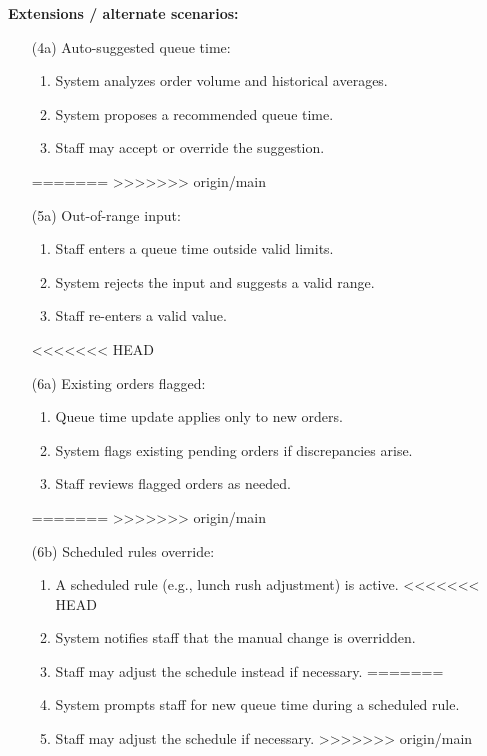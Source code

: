 \documentclass{article}
\begin{document}
\textbf{Extensions / alternate scenarios:}
\begin{itemize}
<<<<<<< HEAD
    \item[(4a)] Auto-suggested queue time:
    \begin{enumerate}
        \item System analyzes order volume and historical averages.
        \item System proposes a recommended queue time.
        \item Staff may accept or override the suggestion.
    \end{enumerate}
=======
>>>>>>> origin/main

    \item[(5a)] Out-of-range input:
    \begin{enumerate}
        \item Staff enters a queue time outside valid limits.
        \item System rejects the input and suggests a valid range.
        \item Staff re-enters a valid value.
    \end{enumerate}

<<<<<<< HEAD
    \item[(6a)] Existing orders flagged:
    \begin{enumerate}
        \item Queue time update applies only to new orders.
        \item System flags existing pending orders if discrepancies arise.
        \item Staff reviews flagged orders as needed.
    \end{enumerate}
=======
>>>>>>> origin/main

    \item[(6b)] Scheduled rules override:
    \begin{enumerate}
        \item A scheduled rule (e.g., lunch rush adjustment) is active.
<<<<<<< HEAD
        \item System notifies staff that the manual change is overridden.
        \item Staff may adjust the schedule instead if necessary.
=======
        \item System prompts staff for new queue time during a scheduled rule.
        \item Staff may adjust the schedule if necessary.
>>>>>>> origin/main
    \end{enumerate}
\end{itemize}
\end{document}
